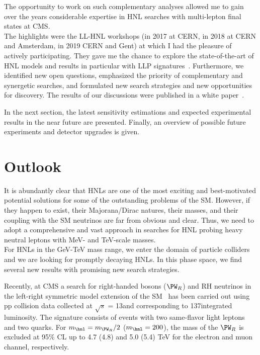 The opportunity to work on such complementary analyses
allowed me to gain over the years considerable expertise in HNL
searches with multi-lepton final states at CMS.\\
The highlights were the LL-HNL workshops (in 2017 at CERN, in 2018 at
CERN and
Amsterdam, in 2019 CERN and Gent) at which I had the pleasure
of actively participating.
 They gave me the chance to explore the 
state-of-the-art of HNL models and results in particular with LLP
signatures~\cite{Alimena_2020}. Furthermore, we identified new open questions, emphasized the priority of complementary and synergetic searches, and formulated new search strategies and new opportunities for discovery. The results of our discussions were published in a white paper~\cite{Alimena_2020}.

In the next section, the latest sensitivity
estimations and expected experimental results in the near future are presented. Finally,
an overview of possible future experiments
and detector upgrades is given. 


\section{Outlook}
It is abundantly clear that HNLs are one of the most
exciting and best-motivated potential solutions for some of the
outstanding problems of the SM. However, if they happen to exist, their
Majorana/Dirac natures, their masses, and their coupling with the SM
neutrinos are far from obvious and clear. Thus, we need to adopt a
comprehensive and vast approach in searches for HNL probing heavy
neutral leptons with MeV- and TeV-scale masses.\\

For HNLs in the GeV-TeV mass range, we enter the domain of 
particle colliders and we are looking for promptly decaying HNLs. 
In this phase space, we find several new results with promising new search strategies.

Recently, at CMS a search for right-handed bosons ($\PW_R$)
and RH neutrinos in the left-right symmetric model extension of the
SM~\cite{CMS-PAS-EXO-20-002} has been carried out using pp collision data collected at $\sqrt{s}$ =
 13\TeV and corresponding to 137\fbinv integrated luminosity. The
 signature consists of events with two same-flavor light leptons and
 two quarks. For $m_\hnl = m_{\PW_{R}}/2$ ($m_\hnl = 200$\GeV), the
 mass of the $\PW_R$ is excluded at 95\% CL up to 4.7 (4.8) and 5.0 (5.4) TeV for the electron and muon
channel, respectively. 

